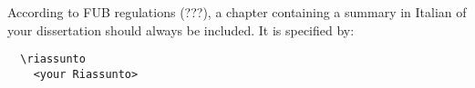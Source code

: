 \riassunto
According to FUB regulations (???), a chapter containing a summary in Italian of your dissertation should always be included.
It is specified by:
\begin{verbatim}
  \riassunto
    <your Riassunto>
\end{verbatim}
